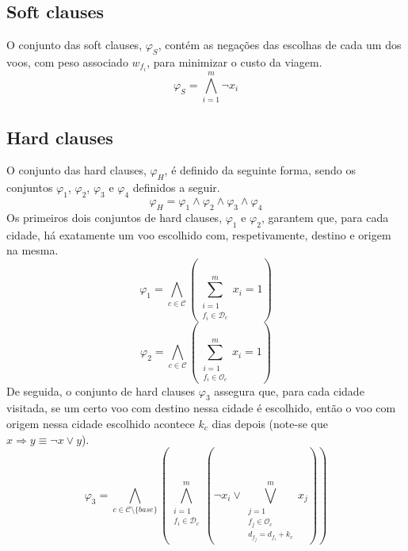 \documentclass[12pt,a4paper]{article}
\begin{document}
    \subsection{Soft clauses}
        O conjunto das soft clauses, $\varphi_S$, contém as negações das escolhas de cada um dos voos, com peso associado $w_{f_i}$, para minimizar o custo da viagem.
        \begin{equation}
            \varphi_S = \bigwedge_{i = 1}^m \neg x_i
            \label{soft_clauses}
        \end{equation}

    \subsection{Hard clauses}
        O conjunto das hard clauses, $\varphi_H$, é definido da seguinte forma, sendo os conjuntos $\varphi_1$, $\varphi_2$, $\varphi_3$ e $\varphi_4$ definidos a seguir.
        \begin{equation}
            \varphi_H = \varphi_1 \land \varphi_2 \land \varphi_3 \land \varphi_4
            \label{hard_clauses}
        \end{equation}
        Os primeiros dois conjuntos de hard clauses, $\varphi_1$ e $\varphi_2$, garantem que, para cada cidade, há exatamente um voo escolhido com, respetivamente, destino e origem na mesma.
        \begin{equation}
            \varphi_1 =
            \bigwedge_{c \in \mathcal{C}}
            \left(
            \sum_{\substack{i = 1 \\
                            f_i \in \mathcal{D}_c}}
                ^{m}
                {x_i} = 1
            \right)
            \label{destination_c}
        \end{equation}
        \begin{equation}
            \varphi_2 =
            \bigwedge_{c \in \mathcal{C}}
            \left(
            \sum_{\substack{i = 1 \\
                            f_i \in \mathcal{O}_c}}
                ^{m}
                {x_i} = 1
            \right)
            \label{origin_c}
        \end{equation}
        De seguida, o conjunto de hard clauses $\varphi_3$ assegura que, para cada cidade visitada, se um certo voo com destino nessa cidade é escolhido, então o voo com origem nessa cidade escolhido acontece $k_c$ dias depois (note-se que $x \Rightarrow y \equiv \neg x \lor y$).
        \begin{equation}
            \varphi_3 =
            \bigwedge_{c \in \mathcal{C} \setminus \{base\}}
            \left(
            \bigwedge_{\substack{i = 1 \\
                                 f_i \in \mathcal{D}_c}}
                     ^{m}
            \left(
            \neg x_i \lor
            \bigvee_{\substack{j = 1 \\
                               f_j \in \mathcal{O}_c \\
                               d_{f_j} = d_{f_i} + k_c}}
                ^{m}
                {x_j}
            \right)
            \right)
            \label{k_nights}
        \end{equation}
\end{document}
